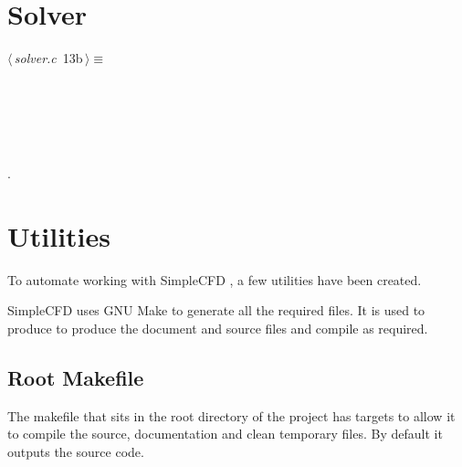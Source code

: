 \documentclass[a4paper,11pt]{article}
\newcommand{\programname}{SimpleCFD }
\begin{document}
\section{Solver}

\begin{flushleft} \small
\begin{minipage}{\linewidth}\label{scrap17}\raggedright\small
{} $\langle\,${\itshape solver.c}\nobreak\ {\footnotesize {13b}}$\,\rangle\equiv$
\vspace{-1ex}
\begin{list}{}{} \item
\mbox{}\verb@@\\
\mbox{}\verb@@\\
\mbox{}\verb@@\\
\mbox{}\verb@@\\
\mbox{}\verb@@{\NWsep}
\end{list}
\vspace{-1.5ex}
\footnotesize
\begin{list}{}{\setlength{\itemsep}{-\parsep}\setlength{\itemindent}{-\leftmargin}}
\item {\NWtxtMacroNoRef}.

\item{}
\end{list}
\end{minipage}\vspace{4ex}
\end{flushleft}
\appendix

\section{Utilities}
To automate working with \programname, a few utilities have been created.

\programname uses GNU Make to generate all the required files. It is used to
produce to produce the document and source files and compile as required. 

\subsection{Root Makefile}
The makefile that sits in the root directory of the project has targets to allow
it to compile the source, documentation and clean temporary files. By default it
outputs the source code.
\end{document}
